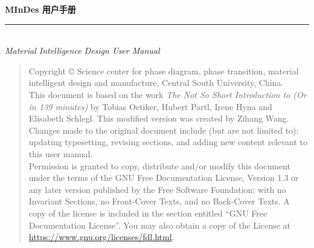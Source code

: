\thispagestyle{empty}

\noindent\begin{minipage}{\textwidth}
  \raggedleft
  {\huge \bfseries MInDes 用户手册}
  \noindent\rule[-1ex]{\textwidth}{5pt}\\[2.5ex]
  \hfill\emph{\Large Material Intelligence Design User Manual}
\end{minipage}

\noindent{}


\newpage\thispagestyle{empty}
\begin{quote}\footnotesize
  Copyright \copyright{} {\the\year} Science center for phase diagram, phase transition, 
  material intelligent design and manufacture, Central South University, China. \\
  This document is based on the work \emph{The Not So Short Introduction to \LaTeXe (Or \LaTeXe in 139 minutes)} by Tobias Oetiker,
  Hubert Partl, Irene Hyna and Elisabeth Schlegl.
  This modified version was created by Zihang Wang.\\
  Changes made to the original document include (but are not limited to):
  updating typesetting, revising sections, and adding new content relevant to this user manual.  \\
  Permission is granted to copy, distribute and/or modify this document
  under the terms of the GNU Free Documentation License, Version 1.3
  or any later version published by the Free Software Foundation;
  with no Invariant Sections, no Front-Cover Texts, and no Back-Cover Texts.
  A copy of the license is included in the section entitled ``GNU
  Free Documentation License''. You may also obtain a copy of the License at 
  \url{https://www.gnu.org/licenses/fdl.html}.
\end{quote}
